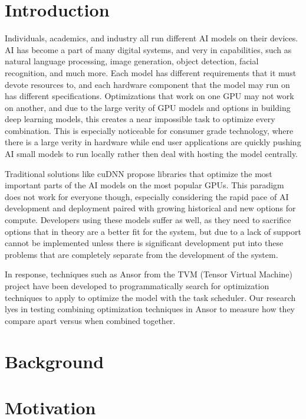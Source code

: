 \documentclass[conference]{IEEEtran}
\begin{document}
\section{Introduction}
Individuals, academics, and industry all run different AI models on their devices.
AI has become a part of many digital systems, and very in capabilities, such as 
natural language processing, image generation, object detection, facial recognition, and much more.
Each model has different requirements that it must devote resources to, 
and each hardware component that the model may run on has different specifications.
Optimizations that work on one GPU may not work on another, 
and due to the large verity of GPU models and options in building deep learning models, 
this creates a near impossible task to optimize every combination.
This is especially noticeable for consumer grade technology, where there is a large verity in hardware
while end user applications are quickly pushing AI small models to run locally rather then deal with hosting the model centrally.

Traditional solutions like cuDNN propose libraries that 
optimize the most important parts of the AI models on the most popular GPUs.
This paradigm does not work for everyone though, 
especially considering the rapid pace of AI development and deployment paired with growing historical and new options for compute.
Developers using these models suffer as well, as they need to sacrifice options that in theory are a better fit for the system,
but due to a lack of support cannot be implemented unless there is significant development put into these problems 
that are completely separate from the development of the system.

In response, techniques such as Ansor from the TVM (Tensor Virtual Machine) project have been developed to 
programmatically search for optimization techniques to apply to optimize the model with the task scheduler.
Our research lyes in testing combining optimization techniques in Ansor to measure how they compare apart versus when combined together. 

\section{Background}


\section{Motivation}
\end{document}
